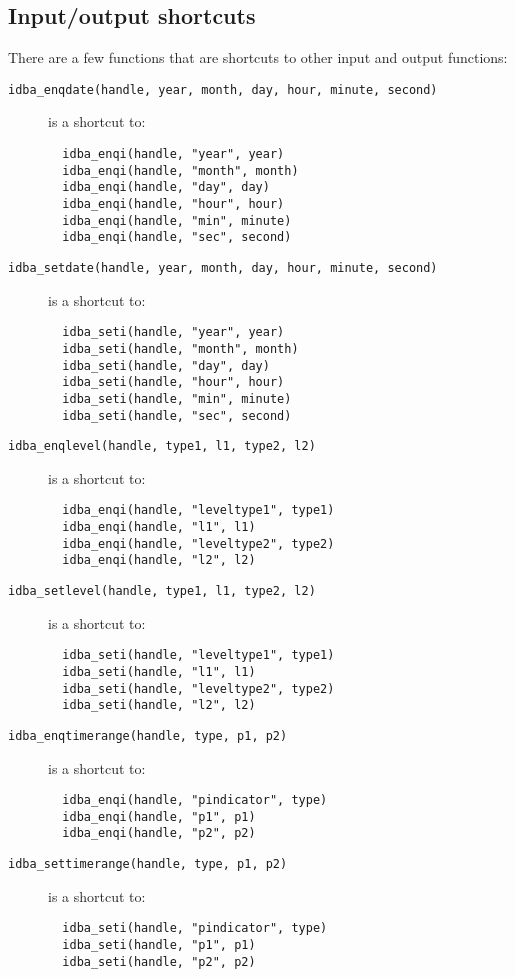 \documentclass[final,12pt,a4paper,twoside]{book}
\begin{document}
\subsection {Input/output shortcuts}

\label{fun-shortcuts}

There are a few functions that are shortcuts to other input and output
functions:

\begin{description}
\item[{\tt idba\_enqdate(handle, year, month, day, hour, minute, second)}]
  is a shortcut to:
  \begin{verbatim}
  idba_enqi(handle, "year", year)
  idba_enqi(handle, "month", month)
  idba_enqi(handle, "day", day)
  idba_enqi(handle, "hour", hour)
  idba_enqi(handle, "min", minute)
  idba_enqi(handle, "sec", second)
  \end{verbatim}
\item[{\tt idba\_setdate(handle, year, month, day, hour, minute, second)}]
  is a shortcut to:
  \begin{verbatim}
  idba_seti(handle, "year", year)
  idba_seti(handle, "month", month)
  idba_seti(handle, "day", day)
  idba_seti(handle, "hour", hour)
  idba_seti(handle, "min", minute)
  idba_seti(handle, "sec", second)
  \end{verbatim}
\item[{\tt idba\_enqlevel(handle, type1, l1, type2, l2)}]
  is a shortcut to:
  \begin{verbatim}
  idba_enqi(handle, "leveltype1", type1)
  idba_enqi(handle, "l1", l1)
  idba_enqi(handle, "leveltype2", type2)
  idba_enqi(handle, "l2", l2)
  \end{verbatim}
\item[{\tt idba\_setlevel(handle, type1, l1, type2, l2)}]
  is a shortcut to:
  \begin{verbatim}
  idba_seti(handle, "leveltype1", type1)
  idba_seti(handle, "l1", l1)
  idba_seti(handle, "leveltype2", type2)
  idba_seti(handle, "l2", l2)
  \end{verbatim}
\item[{\tt idba\_enqtimerange(handle, type, p1, p2)}]
  is a shortcut to:
  \begin{verbatim}
  idba_enqi(handle, "pindicator", type)
  idba_enqi(handle, "p1", p1)
  idba_enqi(handle, "p2", p2)
  \end{verbatim}
\item[{\tt idba\_settimerange(handle, type, p1, p2)}]
  is a shortcut to:
  \begin{verbatim}
  idba_seti(handle, "pindicator", type)
  idba_seti(handle, "p1", p1)
  idba_seti(handle, "p2", p2)
  \end{verbatim}
\end{description}
\end{document}
